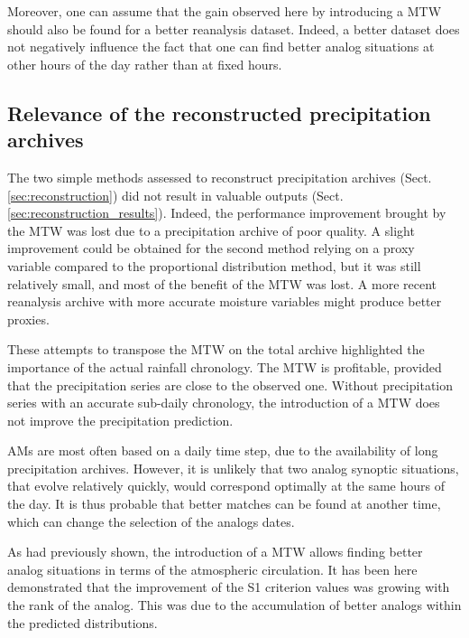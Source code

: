 \documentclass[hess, manuscript]{copernicus}
\begin{document}
Moreover, one can assume that the gain observed here by introducing a MTW should also be found for a better reanalysis dataset. Indeed, a better dataset does not negatively influence the fact that one can find better analog situations at other hours of the day rather than at fixed hours.


\subsection{Relevance of the reconstructed precipitation archives}

The two simple methods assessed to reconstruct precipitation archives (Sect. \ref{sec:reconstruction}) did not result in valuable outputs (Sect. \ref{sec:reconstruction_results}). Indeed, the performance improvement brought by the MTW was lost due to a precipitation archive of poor quality. A slight improvement could be obtained for the second method relying on a proxy variable compared to the proportional distribution method, but it was still relatively small, and most of the benefit of the MTW was lost. A more recent reanalysis archive with more accurate moisture variables might produce better proxies.

These attempts to transpose the MTW on the total archive highlighted the importance of the actual rainfall chronology. The MTW is profitable, provided that the precipitation series are close to the observed one. Without precipitation series with an accurate sub-daily chronology, the introduction of a MTW does not improve the precipitation prediction.



\conclusions  %
\label{sec:conclusions}

AMs are most often based on a daily time step, due to the availability of long precipitation archives. However, it is unlikely that two analog synoptic situations, that evolve relatively quickly, would correspond optimally at the same hours of the day. It is thus probable that better matches can be found at another time, which can change the selection of the analogs dates.

As \citet{Finet2008} had previously shown, the introduction of a MTW allows finding better analog situations in terms of the atmospheric circulation. It has been here demonstrated that the improvement of the S1 criterion values was growing with the rank of the analog. This was due to the accumulation of better analogs within the predicted distributions.
\end{document}
